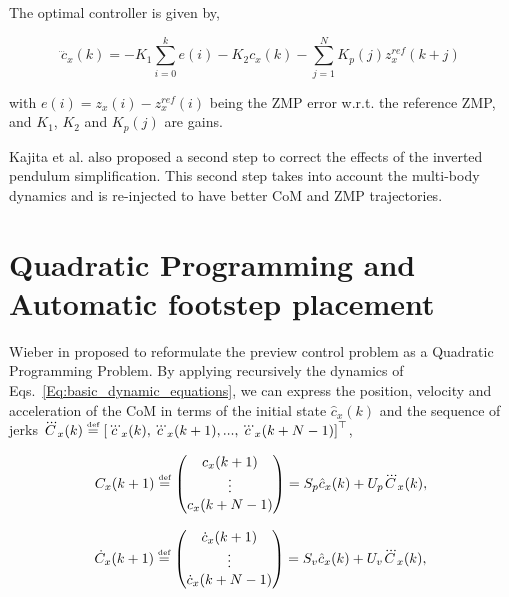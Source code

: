 The optimal controller is given by,

\begin{equation}
\dddot{c}_x(k) = -K_1 \sum\limits_{i=0}^{k} e(i)-K_2c_x(k) - \sum\limits_{j=1}^{N} K_p(j)z_x^{ref}(k+j)
\end{equation}

\noindent with $e(i) = z_x(i) - z_x^{ref}(i)$ being the ZMP error w.r.t. the reference ZMP, and $K_1$, $K_2$ and $K_p(j)$ are gains.

Kajita et al. also proposed a second step to correct the effects of the inverted pendulum simplification. This second step takes into account the multi-body dynamics and is re-injected to have better CoM and ZMP trajectories.

\section{Quadratic Programming and Automatic footstep placement}

Wieber in \citep{WieberHumanoids2006} proposed to reformulate the preview control problem as a Quadratic Programming Problem. By applying recursively the dynamics of Eqs.~\ref{Eq:basic_dynamic_equations}, we can express the position, velocity and acceleration  of the CoM in terms of the initial state $\hat{c}_x(k)$ and the sequence of jerks $\dddot{ C}_x(k) \stackrel{\mbox{\tiny def}}{=} \left[ \dddot{c}_x(k), \dddot{c}_x(k+1),...,\dddot{c}_x(k+N-1) \right]^{\top}$,

\begin{equation}
 \label{Eq:PosCMHorizon}
 {C}_x(k+1) \stackrel{\mbox{\tiny def}}{=}  \left(
 \begin{matrix}
  c_x(k+1) \\
  \vdots \\
  c_x(k+N-1)
 \end{matrix}
 \right) = {S}_p \hat{c}_x(k) + { U}_p \dddot{C}_x(k),
\end{equation}

\begin{equation}
 \label{Eq:VelCMHorizon}
 \dot{C}_x(k+1) \stackrel{\mbox{\tiny def}}{=}  \left(
 \begin{matrix}
  \dot{c}_x(k+1) \\
  \vdots \\
  \dot{c}_x(k+N-1)
 \end{matrix}
 \right) = {S}_v \hat{c}_x(k) + { U}_v \dddot{ C}_x(k),
\end{equation}

